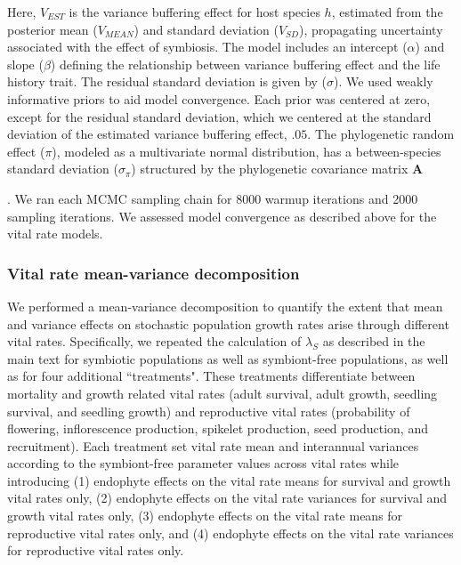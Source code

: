 \documentclass[lineno,sn-nature]{sn-jnl}%
\providecommand{\DIFadd}[1]{{\protect\color{blue}#1}} %
\providecommand{\DIFadd}[1]{{\protect\color{blue}\uwave{#1}}} %
\begin{document}
\begin{appendices}
\DIFadd{Here, $V_{EST}$ is the variance buffering effect for host species $h$, estimated from the posterior mean ($V_{MEAN}$) and standard deviation ($V_{SD}$), propagating uncertainty associated with the effect of symbiosis.
The model includes an intercept ($\alpha$) and slope ($\beta$) defining the relationship between variance buffering effect and the life history trait. 
The residual standard deviation is given by ($\sigma$). 
We used weakly informative priors to aid model convergence.
Each prior was centered at zero, except for the residual standard deviation, which we centered at the standard deviation of the estimated variance buffering effect, $.05$.
The phylogenetic random effect ($\pi$), modeled as a multivariate normal distribution, has a between-species standard deviation ($\sigma_{\pi}$) structured by the phylogenetic covariance matrix }\textbf{\DIFadd{A}}\DIFadd{.
We ran each MCMC sampling chain for 8000 warmup iterations and 2000 sampling iterations. 
We assessed model convergence as described above for the vital rate models.

}

\subsubsection*{Vital rate mean-variance decomposition}{
	\DIFadd{We performed a mean-variance decomposition to quantify the extent that mean and variance effects on stochastic population growth rates arise through different vital rates. 
	Specifically, we repeated the calculation of $\lambda_S$ as described in the main text for symbiotic populations as well as symbiont-free populations, as well as for four additional ``treatments". 
	These treatments differentiate between mortality and growth related vital rates (adult survival, adult growth, seedling survival, and seedling growth) and reproductive vital rates (probability of flowering, inflorescence production, spikelet production, seed production, and recruitment). 
	Each treatment set vital rate mean and interannual variances according to the symbiont-free parameter values across vital rates while introducing (1) endophyte effects on the vital rate means for survival and growth vital rates only, (2) endophyte effects on the vital rate variances for survival and growth vital rates only, (3) endophyte effects on the vital rate means for reproductive vital rates only, and (4) endophyte effects on the vital rate variances for reproductive vital rates only.
	
}

}
\end{appendices}
\end{document}
